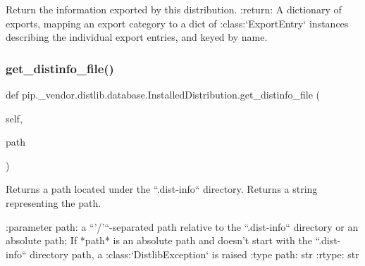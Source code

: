 \begin{DoxyVerb}Return the information exported by this distribution.
:return: A dictionary of exports, mapping an export category to a dict
 of :class:`ExportEntry` instances describing the individual
 export entries, and keyed by name.
\end{DoxyVerb}
 \mbox{\label{classpip_1_1__vendor_1_1distlib_1_1database_1_1InstalledDistribution_ac17c694fe33794a2a93c022eae8919fc}} 
\subsubsection{\texorpdfstring{get\+\_\+distinfo\+\_\+file()}{get\_distinfo\_file()}}
{\footnotesize\ttfamily def pip.\+\_\+vendor.\+distlib.\+database.\+Installed\+Distribution.\+get\+\_\+distinfo\+\_\+file (\begin{DoxyParamCaption}\item[{}]{self,  }\item[{}]{path }\end{DoxyParamCaption})}

\begin{DoxyVerb}Returns a path located under the ``.dist-info`` directory. Returns a
string representing the path.

:parameter path: a ``'/'``-separated path relative to the
         ``.dist-info`` directory or an absolute path;
         If *path* is an absolute path and doesn't start
         with the ``.dist-info`` directory path,
         a :class:`DistlibException` is raised
:type path: str
:rtype: str
\end{DoxyVerb}
 \mbox{\label{classpip_1_1__vendor_1_1distlib_1_1database_1_1InstalledDistribution_ad84e1afa18adad68245f91f86aed9c17}} 
